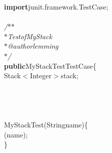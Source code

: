 {{\def\dash{\raise2.1pt\hbox{\rule{5pt}{0.3pt}}\hspace{1pt}}\begin{tabbing}
{\textbf{import}}\hspace{6pt}junit.framework.TestCase;\\
\\
{\it{/$\ast$$\ast$}}\\
{\it{\hspace{6pt}$\ast$\hspace{6pt}Test\hspace{6pt}of\hspace{6pt}MyStack}}\\
{\it{\hspace{6pt}$\ast$\hspace{6pt}@author\hspace{6pt}lemming}}\\
{\it{\hspace{6pt}$\ast$/}}\\
{\textbf{public}}\hspace{6pt}MyStackTest\hspace{6pt}TestCase\hspace{6pt}\{\\
\makebox[48pt][l]{}Stack$<$Integer$>$\hspace{6pt}stack;\\
\makebox[48pt][l]{}{\it{/$\ast$$\ast$}}\\
\\
\\
\makebox[48pt][l]{}{\it{\hspace{6pt}$\ast$/}}\\
\hspace{6pt}MyStackTest(String\hspace{6pt}name)\hspace{6pt}\{\\
\makebox[48pt][l]{}(name);\\
\makebox[48pt][l]{}\}\\

\end{tabbing}}}

